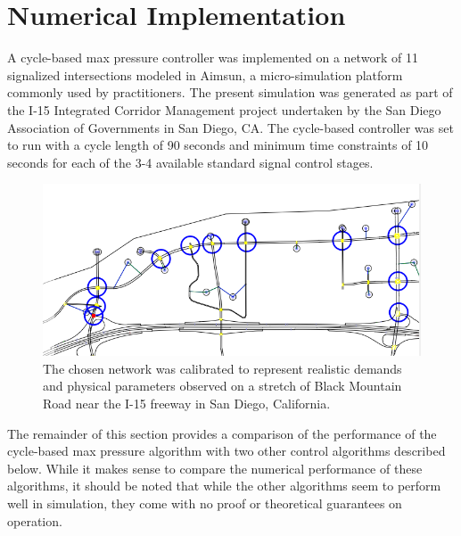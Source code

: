 \section{Numerical Implementation}
A cycle-based max pressure controller was implemented on a network of 11 signalized intersections modeled in Aimsun, a micro-simulation platform commonly used by practitioners. The present simulation was generated as part of the I-15 Integrated Corridor Management project undertaken by the San Diego Association of Governments in San Diego, CA. 
The cycle-based controller was set to run with a cycle length of 90 seconds and minimum time constraints of 10 seconds for each of the 3-4 available standard signal control stages.  
\begin{figure}[h!]
\vspace{-.2em}
\centering
\includegraphics[width=.8\columnwidth]{./i15network.png}
\caption{The chosen network was calibrated to represent realistic demands and physical parameters observed on a stretch of Black Mountain Road near the I-15 freeway in San Diego, California.}
\end{figure}

The remainder of this section provides a comparison of the performance of the cycle-based max pressure algorithm with two other control algorithms described below. While it makes sense to compare the numerical performance of these algorithms, it should be noted that while the other algorithms seem to perform well in simulation, they come with no proof or theoretical guarantees on operation.
 
